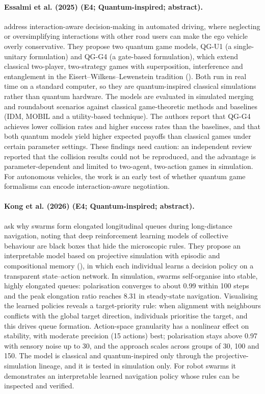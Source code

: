 \documentclass[10pt,a4paper]{article}
\begin{document}
\paragraph{Essalmi et al. (2025) (E4; Quantum-inspired; abstract).} \citet{Essalmi2025} address interaction-aware decision-making in automated driving, where neglecting or oversimplifying interactions with other road users can make the ego vehicle overly conservative. They propose two quantum game models, QG-U1 (a single-unitary formulation) and QG-G4 (a gate-based formulation), which extend classical two-player, two-strategy games with superposition, interference and entanglement in the Eisert--Wilkens--Lewenstein tradition (\citep{Eisert1999}). Both run in real time on a standard computer, so they are quantum-inspired classical simulations rather than quantum hardware. The models are evaluated in simulated merging and roundabout scenarios against classical game-theoretic methods and baselines (IDM, MOBIL and a utility-based technique). The authors report that QG-G4 achieves lower collision rates and higher success rates than the baselines, and that both quantum models yield higher expected payoffs than classical games under certain parameter settings. These findings need caution: an independent review reported that the collision results could not be reproduced, and the advantage is parameter-dependent and limited to two-agent, two-action games in simulation. For autonomous vehicles, the work is an early test of whether quantum game formalisms can encode interaction-aware negotiation.

\paragraph{Kong et al. (2026) (E4; Quantum-inspired; abstract).} \citet{Kong2026} ask why swarms form elongated longitudinal queues during long-distance navigation, noting that deep reinforcement learning models of collective behaviour are black boxes that hide the microscopic rules. They propose an interpretable model based on projective simulation with episodic and compositional memory (\citep{Briegel2012}), in which each individual learns a decision policy on a transparent state--action network. In simulation, swarms self-organise into stable, highly elongated queues: polarisation converges to about 0.99 within 100 steps and the peak elongation ratio reaches 8.31 in steady-state navigation. Visualising the learned policies reveals a target-priority rule: when alignment with neighbours conflicts with the global target direction, individuals prioritise the target, and this drives queue formation. Action-space granularity has a nonlinear effect on stability, with moderate precision (15 actions) best; polarisation stays above 0.97 with sensory noise up to 30\textdegree{}, and the approach scales across groups of 30, 100 and 150. The model is classical and quantum-inspired only through the projective-simulation lineage, and it is tested in simulation only. For robot swarms it demonstrates an interpretable learned navigation policy whose rules can be inspected and verified.
\end{document}
